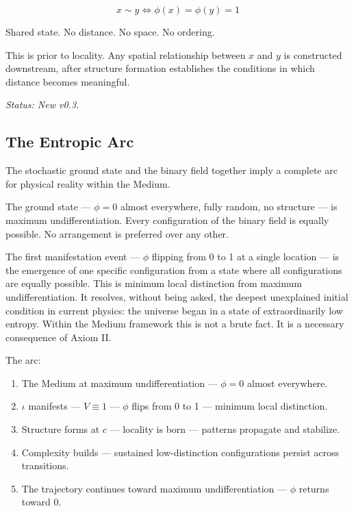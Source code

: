 \documentclass[11pt,letterpaper]{article}
\begin{document}
\begin{equation}
x \sim y \iff \phi(x) = \phi(y) = 1
\end{equation}

\begin{center}
Shared state. No distance. No space. No ordering.
\end{center}

This is prior to locality. Any spatial relationship between \(x\) and \(y\) is constructed downstream, after structure formation establishes the conditions in which distance becomes meaningful.

\emph{Status: New v0.3.}
\subsection{The Entropic Arc}
\label{sec:org53bc822}

The stochastic ground state and the binary field together imply a complete arc for physical reality within the Medium.

The ground state --- \(\phi = 0\) almost everywhere, fully random, no structure --- is maximum undifferentiation. Every configuration of the binary field is equally possible. No arrangement is preferred over any other.

The first manifestation event --- \(\phi\) flipping from 0 to 1 at a single location --- is the emergence of one specific configuration from a state where all configurations are equally possible. This is minimum local distinction from maximum undifferentiation. It resolves, without being asked, the deepest unexplained initial condition in current physics: the universe began in a state of extraordinarily low entropy. Within the Medium framework this is not a brute fact. It is a necessary consequence of Axiom II.

The arc:

\begin{enumerate}
\item The Medium at maximum undifferentiation --- \(\phi = 0\) almost everywhere.
\item \(\iota\) manifests --- \(V \equiv 1\) --- \(\phi\) flips from 0 to 1 --- minimum local distinction.
\item Structure forms at \(c\) --- locality is born --- patterns propagate and stabilize.
\item Complexity builds --- sustained low-distinction configurations persist across transitions.
\item The trajectory continues toward maximum undifferentiation --- \(\phi\) returns toward 0.
\end{enumerate}
\end{document}
